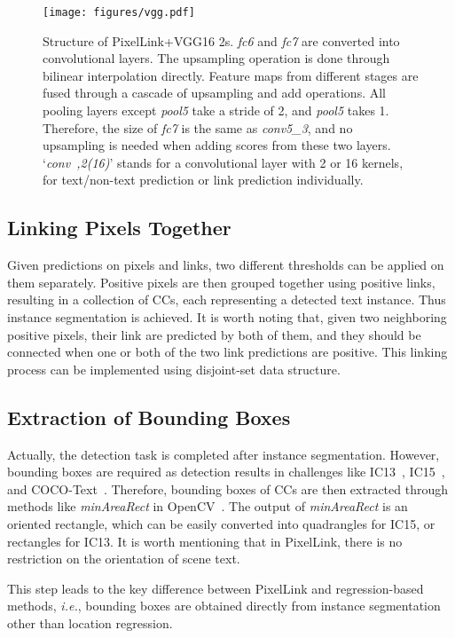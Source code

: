 \documentclass[letterpaper]{article} \usepackage{aaai18}  \usepackage{times}  \usepackage{helvet}  \usepackage{courier}  \usepackage{url}  \usepackage{graphicx}
\begin{document}
	\begin{figure}[t!]
		\centering
		\texttt{[image: figures/vgg.pdf]}
		\caption{Structure of PixelLink+VGG16 2s.
			\emph{fc6 }and \emph{fc7} are converted into convolutional layers. The upsampling operation is done through bilinear interpolation directly. Feature maps from different stages are fused through a cascade of upsampling and add operations. All pooling layers except \emph{pool5} take a stride of 2, and \emph{pool5} takes 1. Therefore, the size of \emph{fc7} is the same as \emph{conv5\_3}, and no upsampling is needed when adding scores from these two layers. \mbox{`\emph{conv ,2(16)}'} stands for a  convolutional layer with 2 or 16 kernels, for text/non-text prediction or link prediction individually.}
		\label{figure:vgg16}
	\end{figure}
	
	\subsection{Linking Pixels Together}
	\label{sec:linking-pixels-together}
	Given predictions on pixels and links, two different thresholds can be applied  on them separately. Positive pixels are then grouped together using positive links, resulting in a collection of CCs, each representing a detected text instance. Thus instance segmentation is achieved.  It is worth noting that, given two neighboring positive pixels, their link are predicted by both of them, and they should be connected when one or both of the two link predictions are positive. This linking process can be implemented using disjoint-set data structure. 
	
	
	\subsection{Extraction of Bounding Boxes}
	Actually, the detection task is completed after instance segmentation. However, bounding boxes are required as detection results in challenges like IC13~\cite{Karatzas2013ICDAR}, IC15~\cite{Karatzas2015ICDAR}, and COCO-Text~\cite{Veit2016COCO}. Therefore, bounding boxes of CCs are then extracted through methods like \emph{minAreaRect} in OpenCV~\cite{opencv}. The output of \emph{minAreaRect} is an oriented rectangle, which can be easily converted into quadrangles for IC15, or rectangles for IC13. It is worth mentioning that in PixelLink, there is no restriction on the orientation of scene text.
	
	This step leads to the key difference between PixelLink and regression-based methods, \emph{i.e.}, bounding boxes are obtained directly from instance segmentation other than location regression.
	
\end{document}
